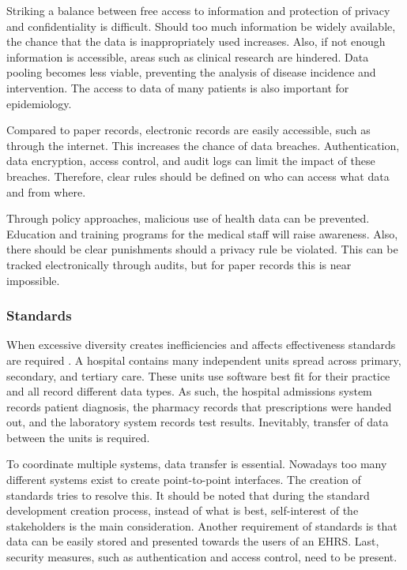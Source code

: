         Striking a balance between free access to information and protection of privacy and confidentiality is difficult. Should too much information be widely available, the chance that the data is inappropriately used increases. Also, if not enough information is accessible, areas such as clinical research are hindered. Data pooling becomes less viable, preventing the analysis of disease incidence and intervention. The access to data of many patients is also important for epidemiology.

        Compared to paper records, electronic records are easily accessible, such as through the internet. This increases the chance of data breaches. Authentication, data encryption, access control, and audit logs can limit the impact of these breaches. Therefore, clear rules should be defined on who can access what data and from where.

        Through policy approaches, malicious use of health data can be prevented. Education and training programs for the medical staff will raise awareness. Also, there should be clear punishments should a privacy rule be violated. This can be tracked electronically through audits, but for paper records this is near impossible.

        \subsubsection{Standards} \label{2_standards}

        When excessive diversity creates inefficiencies and affects effectiveness standards are required \cite{biomedical_informatics}. A hospital contains many independent units spread across primary, secondary, and tertiary care. These units use software best fit for their practice and all record different data types. As such, the hospital admissions system records patient diagnosis, the pharmacy records that prescriptions were handed out, and the laboratory system records test results. Inevitably, transfer of data between the units is required. 

        To coordinate multiple systems, data transfer is essential. Nowadays too many different systems exist to create point-to-point interfaces. The creation of standards tries to resolve this. It should be noted that during the standard development creation process, instead of what is best, self-interest of the stakeholders is the main consideration. Another requirement of standards is that data can be easily stored and presented towards the users of an EHRS. Last, security measures, such as authentication and access control, need to be present.

